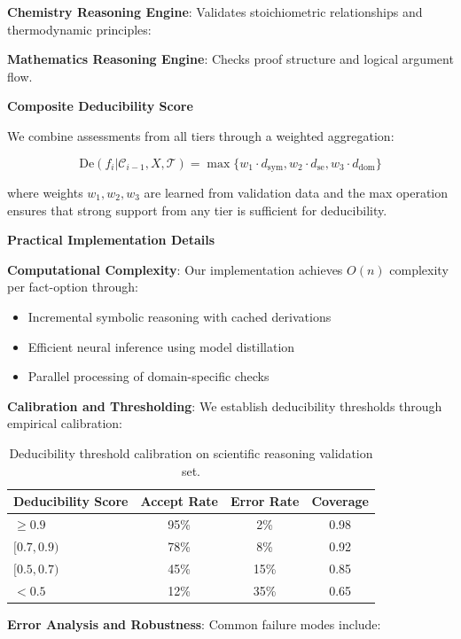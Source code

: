 \documentclass{uai2026} %
\theoremstyle{remark}
\theoremstyle{plain}
\theoremstyle{definition}
\begin{document}
\textbf{Chemistry Reasoning Engine}: Validates stoichiometric relationships and thermodynamic principles:

\textbf{Mathematics Reasoning Engine}: Checks proof structure and logical argument flow.

\textbf{Composite Deducibility Score}

We combine assessments from all tiers through a weighted aggregation:

\begin{equation}
\text{De}(f_i | \mathcal{C}_{i-1}, X, \mathcal{T}) = \max\{
w_1 \cdot d_{\text{sym}},
w_2 \cdot d_{\text{se}},
w_3 \cdot d_{\text{dom}}
\}
\end{equation}

where weights $w_1, w_2, w_3$ are learned from validation data and the max operation ensures that strong support from any tier is sufficient for deducibility.

\textbf{Practical Implementation Details}

\textbf{Computational Complexity}: Our implementation achieves $O(n)$ complexity per fact-option through:
\begin{itemize}
\item Incremental symbolic reasoning with cached derivations
\item Efficient neural inference using model distillation
\item Parallel processing of domain-specific checks
\end{itemize}

\textbf{Calibration and Thresholding}: We establish deducibility thresholds through empirical calibration:

\begin{table}[ht]
\centering
\small
\caption{Deducibility threshold calibration on scientific reasoning validation set.}
\label{tab:deducibility-calibration}
\begin{tabular}{l|c|c|c}
\hline
Deducibility Score & Accept Rate & Error Rate & Coverage \\
\hline
$\geq 0.9$ & 95\% & 2\% & 0.98 \\
$[0.7, 0.9)$ & 78\% & 8\% & 0.92 \\
$[0.5, 0.7)$ & 45\% & 15\% & 0.85 \\
$< 0.5$ & 12\% & 35\% & 0.65 \\
\hline
\end{tabular}
\end{table}

\textbf{Error Analysis and Robustness}: Common failure modes include:
\end{document}
